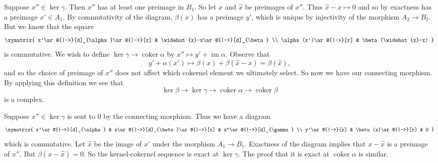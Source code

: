 \documentclass[12pt]{article}
\DeclareMathOperator{\coker}{coker}
\DeclareMathOperator{\im}{im}
\begin{document}
Suppose $x''\in\ker\gamma$.  Then $x''$ has at least one preimage in $B_1$.
So let $x$ and $\widehat{x}$ be preimages of $x''$.
Thus $\widehat{x}-x\mapsto 0$ and so by exactness has a
preimage $x'\in A_1$.
By commutativity of the diagram, $\beta(x)$ has a preimage $y'$, which is
unique by injectivity of the morphism $A_2\to B_2$.  But we know
that the square
\[\xymatrix{
x'\ar@{|->}[d]_{\alpha}\ar@{|->}[r] & \widehat{x}-x\ar@{|->}[d]_{\beta} \\
\alpha(x')\ar@{|->}[r] & \beta(\widehat{x}-x)
}\]
is commutative.
We wish to define $\ker\gamma\to\coker\alpha$ by
$x''\mapsto y'+\im\alpha$.
Observe that
\[y'+\alpha(x')\mapsto\beta(x)+\beta(\widehat{x}-x)=\beta(\widehat{x}),\]
and so the choice of preimage of $x''$ does not affect which cokernel
element we ultimately select.  So now we have our connecting
morphism.  By applying this definition we see that
\[\ker\beta\to\ker\gamma\to\coker\alpha\to\coker\beta\]
is a complex.

Suppose $x''\in\ker\gamma$ is sent to $0$ by the connecting morphism.
Thus we have a diagram
\[\xymatrix{
x'\ar@{|->}[d]_{\alpha} & x\ar@{|->}[d]_{\beta}\ar@{|->}[r] & x''\ar@{|->}[d]_{\gamma} \\
y'\ar@{|->}[r] & \beta(x)\ar@{|->}[r] & 0
}\]
which is commutative.  Let $\widehat{x}$ be the image of $x'$ under the
morphism $A_1\to B_1$.  Exactness of the diagram implies that $x-\widehat{x}$
is a preimage of $x''$.  But $\beta(x-\widehat{x})=0$.  So the kernel-cokernel
sequence is exact at $\ker\gamma$.  The proof that it is exact at
$\coker\alpha$ is similar.\qedhere
\end{document}
